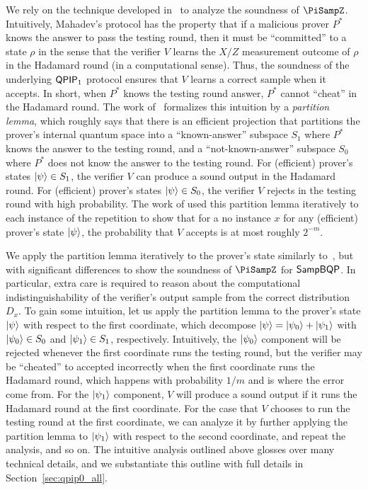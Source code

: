We rely on the technique developed in~\cite{arXiv:ChiaChungYam19} to analyze the soundness of $\PiSampZ$. Intuitively, Mahadev's protocol has the property that if a malicious prover $P^*$ knows the answer to pass the testing round, then it must be ``committed'' to a state $\rho$ in the sense that the verifier $V$ learns the $X/Z$ measurement outcome of $\rho$ in the Hadamard round (in a computational sense). Thus, the soundness of the underlying $\operatorname{\mathsf{QPIP}}_1$ protocol ensures that $V$ learns a correct sample when it accepts. In short, when $P^*$ knows the testing round answer,  $P^*$ cannot ``cheat'' in the Hadamard round. The work of~\cite{arXiv:ChiaChungYam19} formalizes this intuition by a \emph{partition lemma}, which roughly says that there is an efficient projection that partitions the prover's internal quantum space into a ``known-answer'' subspace $S_1$ where $P^*$ knows the answer to the testing round, and a ``not-known-answer'' subspace $S_0$ where $P^*$ does not know the answer to the testing round. For (efficient) prover's states $\ket{\psi} \in S_1$, the verifier $V$ can produce a sound output in the Hadamard round. For (efficient) prover's states $\ket{\psi} \in S_0$, the verifier $V$ rejects in the testing round with high probability. The work of \cite{arXiv:ChiaChungYam19} used this partition lemma iteratively to each instance of the repetition to show that for a no instance $x$ for any (efficient) prover's state $\ket{\psi}$, the probability that $V$ accepts is at most roughly $2^{-m}$.

We apply the partition lemma iteratively to the prover's state  similarly to~\cite{arXiv:ChiaChungYam19}, but with significant differences to show the soundness of $\PiSampZ$ for $\operatorname{\mathsf{SampBQP}}$. In particular, extra care is required to reason about the computational indistinguishability of the verifier's output sample from the correct distribution $D_x$. To gain some intuition, let us apply the partition lemma to the prover's state $\ket{\psi}$ with respect to the first coordinate, which decompose $\ket{\psi} = \ket{\psi_0} + \ket{\psi_1}$ with $\ket{\psi_0} \in S_0$ and  $\ket{\psi_1} \in S_1$, respectively. Intuitively, the $\ket{\psi_0}$ component will be rejected whenever the first coordinate runs the testing round, but the verifier may be ``cheated'' to accepted incorrectly when the first coordinate runs the Hadamard round, which happens with probability $1/m$ and is where the error come from. For the $\ket{\psi_1}$ component, $V$ will produce a sound output if it runs the Hadamard round at the first coordinate. For the case that $V$ chooses to run the testing round at the first coordinate, we can analyze it by further applying the partition lemma to $\ket{\psi_1}$ with respect to the second coordinate, and repeat the analysis, and so on. 
%
The intuitive analysis outlined above glosses over many technical details, and we substantiate this outline with full details in  
Section~\ref{sec:qpip0_all}.

